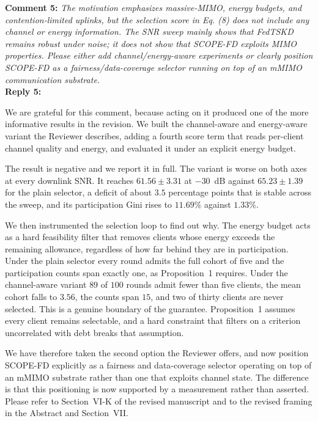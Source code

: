 \documentclass[10pt]{article}
\begin{document}
\noindent
\textbf{Comment 5:} \textit{The motivation emphasizes massive-MIMO, energy budgets, and contention-limited uplinks, but the selection score in Eq. (8) does not include any channel or energy information. The SNR sweep mainly shows that FedTSKD remains robust under noise; it does not show that SCOPE-FD exploits MIMO properties. Please either add channel/energy-aware experiments or clearly position SCOPE-FD as a fairness/data-coverage selector running on top of an mMIMO communication substrate.} \\
\noindent
\textbf{Reply 5:} {We are grateful for this comment, because acting on it produced one of the more informative results in the revision. We built the channel-aware and energy-aware variant the Reviewer describes, adding a fourth score term that reads per-client channel quality and energy, and evaluated it under an explicit energy budget.

The result is negative and we report it in full. The variant is worse on both axes at every downlink SNR. It reaches $61.56 \pm 3.31$ at $-30$~dB against $65.23 \pm 1.39$ for the plain selector, a deficit of about $3.5$ percentage points that is stable across the sweep, and its participation Gini rises to $11.69\%$ against $1.33\%$.

We then instrumented the selection loop to find out why. The energy budget acts as a hard feasibility filter that removes clients whose energy exceeds the remaining allowance, regardless of how far behind they are in participation. Under the plain selector every round admits the full cohort of five and the participation counts span exactly one, as Proposition~1 requires. Under the channel-aware variant $89$ of $100$ rounds admit fewer than five clients, the mean cohort falls to $3.56$, the counts span $15$, and two of thirty clients are never selected. This is a genuine boundary of the guarantee. Proposition~1 assumes every client remains selectable, and a hard constraint that filters on a criterion uncorrelated with debt breaks that assumption.

We have therefore taken the second option the Reviewer offers, and now position SCOPE-FD explicitly as a fairness and data-coverage selector operating on top of an mMIMO substrate rather than one that exploits channel state. The difference is that this positioning is now supported by a measurement rather than asserted. Please refer to Section~VI-K of the revised manuscript and to the revised framing in the Abstract and Section~VII.}\\
\end{document}
